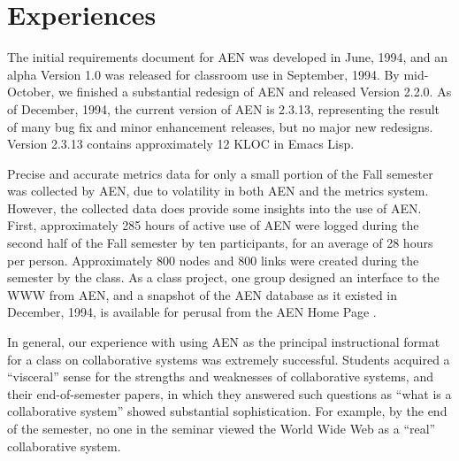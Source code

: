 

\section{Experiences}

The initial requirements document for AEN \cite{csdl-94-06} was developed
in June, 1994, and an alpha Version 1.0 was released for classroom use in
September, 1994.  By mid-October, we finished a substantial redesign of AEN
and released Version 2.2.0.  As of December, 1994, the current version of
AEN is 2.3.13, representing the result of many bug fix and minor
enhancement releases, but no major new redesigns. Version 2.3.13 contains
approximately 12 KLOC in Emacs Lisp.

Precise and accurate metrics data for only a small portion of the Fall
semester was collected by AEN, due to volatility in both AEN and the metrics
system.  However, the collected data does provide some insights into the
use of AEN.  First, approximately 285 hours of active use of AEN were
logged during the second half of the Fall semester by ten participants, for
an average of 28 hours per person.  Approximately 800 nodes and 800 links
were created during the semester by the class.  As a class project, one
group designed an interface to the WWW from AEN, and a snapshot of the AEN
database as it existed in December, 1994, is available for perusal from
the AEN Home Page \cite{csdl-www-aen}.

In general, our experience with using AEN as the principal instructional
format for a class on collaborative systems was extremely successful.
Students acquired a ``visceral'' sense for the strengths and weaknesses of
collaborative systems, and their end-of-semester papers, in which they
answered such questions as ``what is a collaborative system'' showed
substantial sophistication.  For example, by the end of the semester, no
one in the seminar viewed the World Wide Web as a ``real'' collaborative
system.

